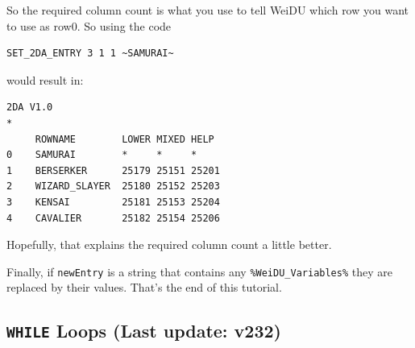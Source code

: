 \documentclass{article}
\def\ttref#1{\ahrefloc{#1}{\tt #1}}
\def\t#1{{\tt #1}}
\begin{document}
So the required column count is what you use to tell WeiDU which row you
want to use as row0. So using the code
\begin{verbatim}
SET_2DA_ENTRY 3 1 1 ~SAMURAI~
\end{verbatim}
would result in:

\begin{verbatim}
2DA V1.0
*
     ROWNAME        LOWER MIXED HELP
0    SAMURAI        *     *     *
1    BERSERKER      25179 25151 25201
2    WIZARD_SLAYER  25180 25152 25203
3    KENSAI         25181 25153 25204
4    CAVALIER       25182 25154 25206
\end{verbatim}

Hopefully, that explains the required column count a little better.

%
%
%
%

Finally, if \t{newEntry} is a string that contains any
\t{\%WeiDU\_Variables\%} they are replaced by their values.
That's the end of this tutorial.

\label{sec-while}\subsection{\t{WHILE} Loops (Last update: v232)}
\end{document}
